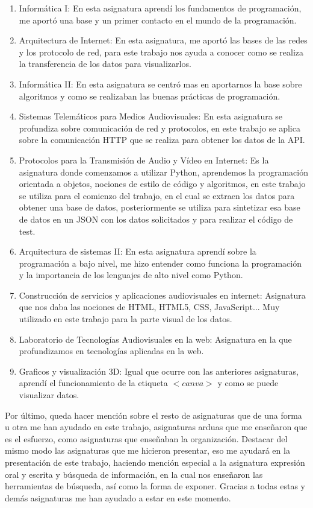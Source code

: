 \documentclass[a4paper, 12pt]{book}
\begin{document}
\begin{enumerate}
  \item Informática I: En esta asignatura aprendí los fundamentos de programación, me aportó una base y un primer contacto en el mundo de la programación.
  \item Arquitectura de Internet: En esta asignatura, me aportó las bases de las redes y los protocolo de red, para este trabajo nos ayuda a conocer como se realiza la transferencia de los datos para visualizarlos.
  \item Informática II: En esta asignatura se centró mas en aportarnos la base sobre algoritmos y como se realizaban las buenas prácticas de programación.
  \item Sistemas Telemáticos para Medios Audiovisuales: En esta asignatura se profundiza sobre comunicación de red y protocolos, en este trabajo se aplica sobre la comunicación HTTP que se realiza para obtener los datos de la API.
  \item Protocolos para la Transmisión de Audio y Vídeo en Internet: Es la asignatura donde comenzamos a utilizar Python, aprendemos la programación orientada a objetos, nociones de estilo de código y algoritmos, en este trabajo se utiliza para el comienzo del trabajo, en el cual se extraen los datos para obtener una base de datos, posteriormente se utiliza para sintetizar esa base de datos en un JSON con los datos solicitados y para realizar el código de test.
  \item Arquitectura de sistemas II: En esta asignatura aprendí sobre la programación a bajo nivel, me hizo entender como funciona la programación y la importancia de los lenguajes de alto nivel como Python.
  \item Construcción de servicios y aplicaciones audiovisuales en internet: Asignatura que nos daba las nociones de HTML, HTML5, CSS, JavaScript... Muy utilizado en este trabajo para la parte visual de los datos.
  \item Laboratorio de Tecnologías Audiovisuales en la web: Asignatura en la que profundizamos en tecnologías aplicadas en la web.
  \item Graficos y visualización 3D: Igual que ocurre con las anteriores asignaturas, aprendí el funcionamiento de la etiqueta $<canva>$ y como se puede visualizar datos.
\end{enumerate}

Por último, queda hacer mención sobre el resto de asignaturas que de una forma u otra me han ayudado en este trabajo, asignaturas arduas que me enseñaron que es el esfuerzo, como asignaturas que enseñaban la organización. Destacar del mismo modo las asignaturas que me hicieron presentar, eso me ayudará en la presentación de este trabajo, haciendo mención especial a la asignatura expresión oral y escrita y búsqueda de información, en la cual nos enseñaron las herramientas de búsqueda, así como la forma de exponer. Gracias a todas estas y demás asignaturas me han ayudado a estar en este momento.
\end{document}
